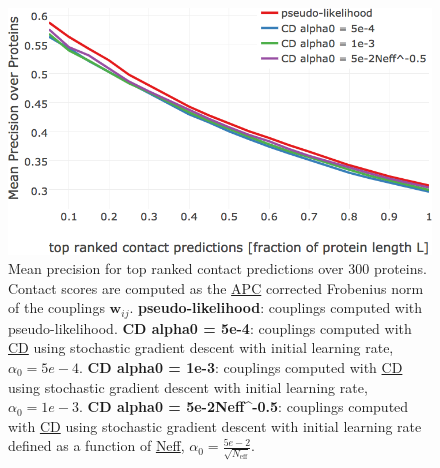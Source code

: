 \documentclass[11pt,a4paper,twoside]{book}
\newcommand{\eq}{\!=\!}
\newcommand{\wij}{\mathbf{w}_{ij}}
\theoremstyle{definition}
\theoremstyle{definition}
\theoremstyle{remark}
\begin{document}
\begin{figure}

{\centering \includegraphics[width=0.85\linewidth]{img/full_likelihood/appendix/precision_vs_rank_learningrates_comparealpha0} 

}

\caption{Mean precision for top ranked
contact predictions over 300 proteins. Contact scores are computed as
the \protect\hyperlink{abbrev}{APC} corrected Frobenius norm of the
couplings \(\wij\). \textbf{pseudo-likelihood}: couplings computed with
pseudo-likelihood. \textbf{CD alpha0 = 5e-4}: couplings computed with
\protect\hyperlink{abbrev}{CD} using stochastic gradient descent with
initial learning rate, \(\alpha_0 \eq 5e-4\). \textbf{CD alpha0 = 1e-3}:
couplings computed with \protect\hyperlink{abbrev}{CD} using stochastic
gradient descent with initial learning rate, \(\alpha_0 \eq 1e-3\).
\textbf{CD alpha0 = 5e-2Neff\^{}-0.5}: couplings computed with
\protect\hyperlink{abbrev}{CD} using stochastic gradient descent with
initial learning rate defined as a function of
\protect\hyperlink{abbrev}{Neff},
\(\alpha_0 \eq \frac{5e-2}{\sqrt{N_{\text{eff}}}}\).}\label{fig:performance-cd-alphaopt-0}
\end{figure}
\end{document}
